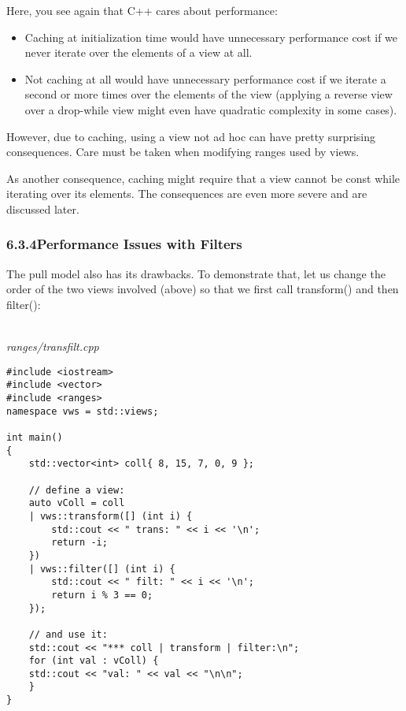 Here, you see again that C++ cares about performance:

\begin{itemize}
\item
Caching at initialization time would have unnecessary performance cost if we never iterate over the elements of a view at all.

\item
Not caching at all would have unnecessary performance cost if we iterate a second or more times over the elements of the view (applying a reverse view over a drop-while view might even have quadratic complexity in some cases).
\end{itemize}

However, due to caching, using a view not ad hoc can have pretty surprising consequences. Care must be taken when modifying ranges used by views.

As another consequence, caching might require that a view cannot be const while iterating over its elements. The consequences are even more severe and are discussed later.

\subsubsection*{ 6.3.4\hspace{0.2cm}Performance Issues with Filters}

The pull model also has its drawbacks. To demonstrate that, let us change the order of the two views involved (above) so that we first call transform() and then filter():

\noindent
\hspace*{\fill} \\ %
\textit{ranges/transfilt.cpp}

\begin{lstlisting}[style=styleCXX]
#include <iostream>
#include <vector>
#include <ranges>
namespace vws = std::views;

int main()
{
	std::vector<int> coll{ 8, 15, 7, 0, 9 };
	
	// define a view:
	auto vColl = coll
	| vws::transform([] (int i) {
		std::cout << " trans: " << i << '\n';
		return -i;
	})
	| vws::filter([] (int i) {
		std::cout << " filt: " << i << '\n';
		return i % 3 == 0;
	});
	
	// and use it:
	std::cout << "*** coll | transform | filter:\n";
	for (int val : vColl) {
	std::cout << "val: " << val << "\n\n";
	}
}
\end{lstlisting}


